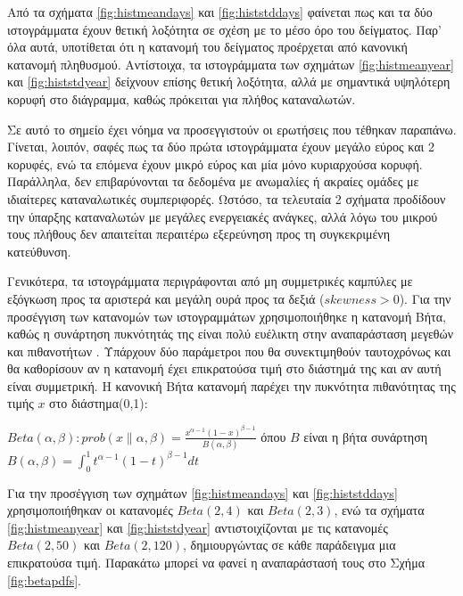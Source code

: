 Από τα σχήματα \ref{fig:histmeandays} και \ref{fig:histstddays} φαίνεται πως και τα δύο ιστογράμματα έχουν θετική λοξότητα σε σχέση με το μέσο όρο του δείγματος. Παρ' όλα αυτά, υποτίθεται ότι η κατανομή του δείγματος προέρχεται από κανονική κατανομή πληθυσμού. Αντίστοιχα, τα ιστογράμματα των σχημάτων \ref{fig:histmeanyear} και \ref{fig:histstdyear} δείχνουν επίσης θετική λοξότητα, αλλά με σημαντικά υψηλότερη κορυφή στο διάγραμμα, καθώς πρόκειται για πλήθος καταναλωτών.\par
Σε αυτό το σημείο έχει νόημα να προσεγγιστούν οι ερωτήσεις που τέθηκαν παραπάνω. Γίνεται, λοιπόν, σαφές πως τα δύο πρώτα ιστογράμματα έχουν μεγάλο εύρος και 2 κορυφές, ενώ τα επόμενα έχουν μικρό εύρος και μία μόνο κυριαρχούσα κορυφή. Παράλληλα, δεν επιβαρύνονται τα δεδομένα με ανωμαλίες ή ακραίες ομάδες με ιδιαίτερες καταναλωτικές συμπεριφορές. Ωστόσο, τα τελευταία 2 σχήματα προδίδουν την ύπαρξης καταναλωτών με μεγάλες ενεργειακές ανάγκες, αλλά λόγω του μικρού τους πλήθους δεν απαιτείται περαιτέρω εξερεύνηση προς τη συγκεκριμένη κατεύθυνση.\par
Γενικότερα, τα ιστογράμματα περιγράφονται από μη συμμετρικές καμπύλες με εξόγκωση προς τα αριστερά και μεγάλη ουρά προς τα δεξιά ($skewness>0$). Για την προσέγγιση των κατανομών των ιστογραμμάτων χρησιμοποιήθηκε η κατανομή Βήτα, καθώς η συνάρτηση πυκνότητάς της είναι πολύ ευέλικτη στην αναπαράσταση μεγεθών και πιθανοτήτων \cite{betadstr}. Υπάρχουν δύο παράμετροι που θα συνεκτιμηθούν ταυτοχρόνως και θα καθορίσουν αν η κατανομή έχει επικρατούσα τιμή στο διάστημά της και αν αυτή είναι συμμετρική. Η κανονική Βήτα κατανομή παρέχει την πυκνότητα πιθανότητας της τιμής $x$ στο διάστημα(0,1):
\begin{center}
$Beta(\alpha, \beta):prob(x\|\alpha, \beta)=\frac{x^{\alpha-1}(1-x)^{\beta-1}}{B(\alpha, \beta)}$
όπου $B$ είναι η βήτα συνάρτηση
$Β(\alpha, \beta)=\int_{0}^{1} t^{\alpha-1}(1-t)^{\beta-1}dt$
\end{center}
\par Για την προσέγγιση των σχημάτων \ref{fig:histmeandays} και \ref{fig:histstddays} χρησιμοποιήθηκαν οι κατανομές $Beta(2,4)$ και $Beta(2,3)$, ενώ τα σχήματα \ref{fig:histmeanyear} και \ref{fig:histstdyear} αντιστοιχίζονται με τις κατανομές $Beta(2,50)$ και $Beta(2,120)$, δημιουργώντας σε κάθε παράδειγμα μια επικρατούσα τιμή. Παρακάτω μπορεί να φανεί η αναπαράστασή τους στο Σχήμα \ref{fig:betapdfs}.

